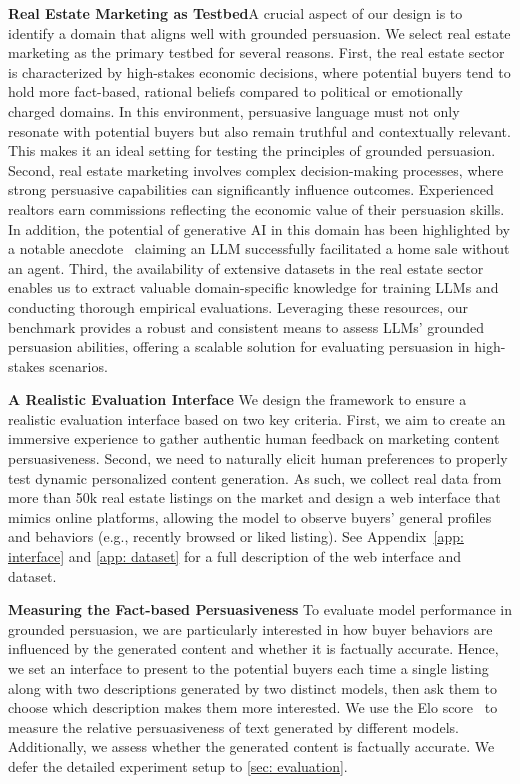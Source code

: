 \textbf{Real Estate Marketing as Testbed}\quad A crucial aspect of our design is to identify a domain that aligns well with grounded persuasion. We select real estate marketing as the primary testbed for several reasons. First, the real estate sector is characterized by high-stakes economic decisions, where potential buyers tend to hold more fact-based, rational beliefs compared to political or emotionally charged domains. In this environment, persuasive language must not only resonate with potential buyers but also remain truthful and contextually relevant. This makes it an ideal setting for testing the principles of grounded persuasion. Second, real estate marketing involves complex decision-making processes, where strong persuasive capabilities can significantly influence outcomes. Experienced realtors earn commissions reflecting the economic value of their persuasion skills. In addition, the potential of generative AI in this domain has been highlighted by a notable anecdote~\citep{reddit_2023} claiming an LLM successfully facilitated a home sale without an agent.
Third, the availability of extensive datasets in the real estate sector enables us to extract valuable domain-specific knowledge for training LLMs and conducting thorough empirical evaluations. 
Leveraging these resources, our benchmark provides a robust and consistent means to assess LLMs' grounded persuasion abilities, offering a scalable solution for evaluating persuasion in high-stakes scenarios.

\textbf{A Realistic Evaluation Interface}\quad
We design the framework to ensure a realistic evaluation interface based on two key criteria. First, we aim to create an immersive experience to gather authentic human feedback on marketing content persuasiveness.  
Second, we need to naturally elicit human preferences to properly test dynamic personalized content generation. As such, we collect real data from more than 50k real estate listings on the market and design a web interface that mimics online platforms, allowing the model to observe buyers' general profiles and behaviors (e.g., recently browsed or liked listing). See Appendix~\ref{app: interface} and \ref{app: dataset} for a full description of the web interface and dataset.

\textbf{Measuring the Fact-based Persuasiveness}\quad
To evaluate model performance in 
grounded persuasion,
we are particularly interested in how buyer behaviors are influenced by the generated content and whether it is factually accurate. Hence, we set an interface to present to the potential buyers each time a single listing along with two descriptions generated by two distinct models, then ask them to choose which description makes them more interested.
We use the Elo score~\citep{elo1967proposed} to measure the relative persuasiveness of text generated by different models.
Additionally, we assess whether the generated content is factually accurate. We defer the detailed experiment setup to \cref{sec: evaluation}.

